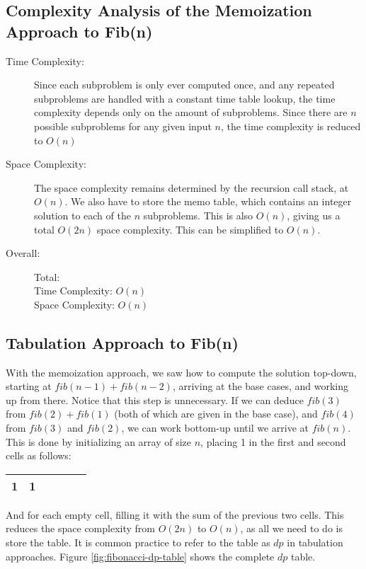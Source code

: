 \subsection{Complexity Analysis of the Memoization Approach to Fib(n)}

\begin{description}
    \item[Time Complexity:]
        Since each subproblem is only ever computed once, and any repeated subproblems are handled with a constant time table lookup,
        the time complexity depends only on the amount of subproblems.
        Since there are $n$ possible subproblems for any given input $n$,
        the time complexity is reduced to $O(n)$

    \item[Space Complexity:] 
        The space complexity remains determined by the recursion call stack, at $O(n)$.
        We also have to store the memo table, which contains an integer solution to each of the $n$ subproblems.
        This is also $O(n)$, giving us a total $O(2n)$ space complexity.
        This can be simplified to $O(n)$.

    \item[Overall:] Total:\\
        Time Complexity: $O(n)$\\
        Space Complexity: $O(n)$
        
\end{description}
\newpage

\subsection{Tabulation Approach to Fib(n)}
    
With the memoization approach, we saw how to compute the solution top-down, starting at $fib(n-1) + fib(n-2)$,
arriving at the base cases, and working up from there.
Notice that this step is unnecessary.
If we can deduce $fib(3)$ from $fib(2) + fib(1)$ (both of which are given in the base case),
and $fib(4)$ from $fib(3)$ and $fib(2)$,
we can work bottom-up until we arrive at $fib(n)$.
This is done by initializing an array of size $n$, placing 1 in the first and second cells as follows:
\begin{table}[H]
    \centering
    \begin{tabular}{|c|c|c|c|c|c|}
        \hline
        1 & 1 & \phantom{0} & \phantom{0} & \phantom{0} & \phantom{0} \\
        \hline
    \end{tabular}
\end{table}
And for each empty cell, filling it with the sum of the previous two cells.
This reduces the space complexity from $O(2n)$ to $O(n)$,
as all we need to do is store the table.
It is common practice to refer to the table as $dp$ in tabulation approaches.
Figure \ref{fig:fibonacci-dp-table} shows the complete $dp$ table.

